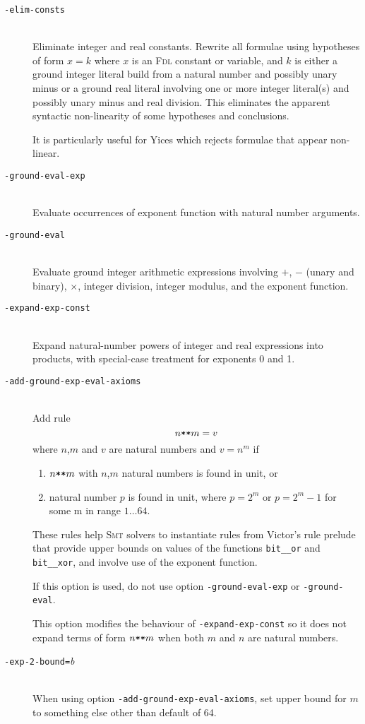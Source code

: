\documentclass[12pt,fleqn]{article}
\newcommand{\smt}{\textsc{Smt}}
\newcommand{\fdl}{\textsc{Fdl}}
\newcommand{\optionb}[1]{\item[\texttt{-{#1}}]\ \\}
\newcommand{\optionv}[2]{\item[\texttt{-{#1}=}\mdseries\textit{#2}]\ \\}
\begin{document}
\begin{description}
\optionb{elim-consts}
Eliminate integer and real constants. Rewrite all formulae using
hypotheses of form $x = k$ where $x$ is an \fdl{} constant or
variable, and $k$ is either a ground integer literal build from a
natural number and possibly unary minus or a ground real literal
involving one or more integer literal(s) and possibly unary minus and
real division.  This eliminates the apparent syntactic non-linearity
of some hypotheses and conclusions.

  It is particularly useful for Yices which rejects formulae that
  appear non-linear.


\optionb{ground-eval-exp}
  Evaluate occurrences of exponent function with natural number arguments.

\optionb{ground-eval}
  Evaluate ground integer arithmetic expressions involving $+$, $-$
  (unary and binary), $\times$, integer division, integer modulus, and
  the exponent function.

\optionb{expand-exp-const}
  Expand natural-number powers of integer and real expressions into products,
  with special-case treatment for exponents 0 and 1.

\optionb{add-ground-exp-eval-axioms}
  Add rule \[n \verb+**+ m = v\] where $n$,$m$ and $v$ are natural numbers and
  $v = n^m$ 
 if
 \begin{enumerate}
 \item $n \verb+**+ m$ with $n$,$m$ natural numbers is found in unit, or
  \item natural number $p$ is found in unit, where $p = 2^m$ or $p = 2^m -1$
    for some m in range $1 \ldots 64$.
  \end{enumerate}
  These rules help \smt{} solvers to instantiate rules from 
  Victor's rule prelude that provide upper bounds on values of the functions
  \texttt{bit\_\_or} and 
  \texttt{bit\_\_xor}, and involve use of the exponent function.

  If this option is used, do not use option \texttt{-ground-eval-exp} or 
  \texttt{-ground-eval}.

  This option modifies the behaviour of \texttt{-expand-exp-const} so 
  it does not expand terms of form $n \verb+**+ m$ when both $m$ and $n$ are
  natural numbers.

\optionv{exp-2-bound}{b}  When using option 
  \texttt{-add-ground-exp-eval-axioms}, set upper bound for $m$ to
  something else other than default of 64.



\end{description}
\end{document}
